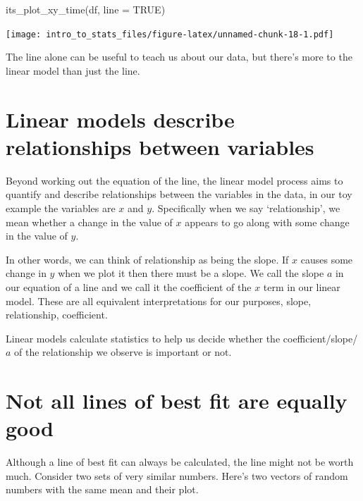 \documentclass[
]{book}
\newenvironment{Shaded}{\begin{snugshade}}{\end{snugshade}}
\newcommand{\AttributeTok}[1]{\textcolor[rgb]{0.77,0.63,0.00}{#1}}
\newcommand{\ConstantTok}[1]{\textcolor[rgb]{0.00,0.00,0.00}{#1}}
\newcommand{\FunctionTok}[1]{\textcolor[rgb]{0.00,0.00,0.00}{#1}}
\newcommand{\NormalTok}[1]{#1}
\begin{document}
\begin{Shaded}
\begin{Highlighting}[]
\FunctionTok{its\_plot\_xy\_time}\NormalTok{(df, }\AttributeTok{line =} \ConstantTok{TRUE}\NormalTok{)}
\end{Highlighting}
\end{Shaded}

\texttt{[image: intro\_to\_stats\_files/figure-latex/unnamed-chunk-18-1.pdf]}

The line alone can be useful to teach us about our data, but there's more to the linear model than just the line.

\hypertarget{linear-models-describe-relationships-between-variables}{%
\section{Linear models describe relationships between variables}\label{linear-models-describe-relationships-between-variables}}

Beyond working out the equation of the line, the linear model process aims to quantify and describe relationships between the variables in the data, in our toy example the variables are \(x\) and \(y\). Specifically when we say `relationship', we mean whether a change in the value of \(x\) appears to go along with some change in the value of \(y\).

In other words, we can think of relationship as being the slope. If \(x\) causes some change in \(y\) when we plot it then there must be a slope. We call the slope \(a\) in our equation of a line and we call it the coefficient of the \(x\) term in our linear model. These are all equivalent interpretations for our purposes, slope, relationship, coefficient.

Linear models calculate statistics to help us decide whether the coefficient/slope/\(a\) of the relationship we observe is important or not.

\hypertarget{not-all-lines-of-best-fit-are-equally-good}{%
\section{Not all lines of best fit are equally good}\label{not-all-lines-of-best-fit-are-equally-good}}

Although a line of best fit can always be calculated, the line might not be worth much. Consider two sets of very similar numbers. Here's two vectors of random numbers with the same mean and their plot.
\end{document}
